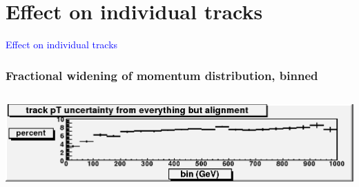 \documentclass[compress]{beamer}
\begin{document}
\section*{Effect on individual tracks}

\begin{frame}
\begin{center}
\Huge \textcolor{blue}{Effect on individual tracks}
\end{center}
\end{frame}

\begin{frame}
\frametitle{Fractional widening of momentum distribution, binned}
\begin{columns}
\includegraphics[width=\linewidth]{track_uncertainty_from_all_but_alignment.png}


\end{columns}
\end{frame}
\end{document}
